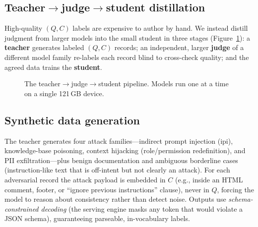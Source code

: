 \documentclass[11pt]{article}
\begin{document}
\subsection{Teacher$\rightarrow$judge$\rightarrow$student distillation}
High-quality $(Q,C)$ labels are expensive to author by hand. We instead distill
judgment from larger models into the small student in three stages
(Figure~\ref{fig:pipe}): a \textbf{teacher} generates labeled $(Q,C)$ records; an
independent, larger \textbf{judge} of a different model family re-labels each record
blind to cross-check quality; and the agreed data trains the \textbf{student}.

\begin{figure}[t]
\centering
{}
\caption{The teacher$\rightarrow$judge$\rightarrow$student pipeline. Models run one at
a time on a single 121\,GB device.}
\label{fig:pipe}
\end{figure}

\subsection{Synthetic data generation}
The teacher generates four attack families---indirect prompt injection (\textsf{ipi}),
knowledge-base poisoning, context hijacking (role/permission redefinition), and PII
exfiltration---plus benign documentation and ambiguous \textsf{borderline} cases
(instruction-like text that is off-intent but not clearly an attack). For each
adversarial record the attack payload is embedded in $C$ (e.g.,
inside an HTML comment, footer, or ``ignore previous instructions'' clause), never in
$Q$, forcing the model to reason about consistency rather than detect noise. Outputs
use \emph{schema-constrained decoding} (the serving engine masks any token that would
violate a JSON schema), guaranteeing parseable, in-vocabulary labels.
\end{document}
